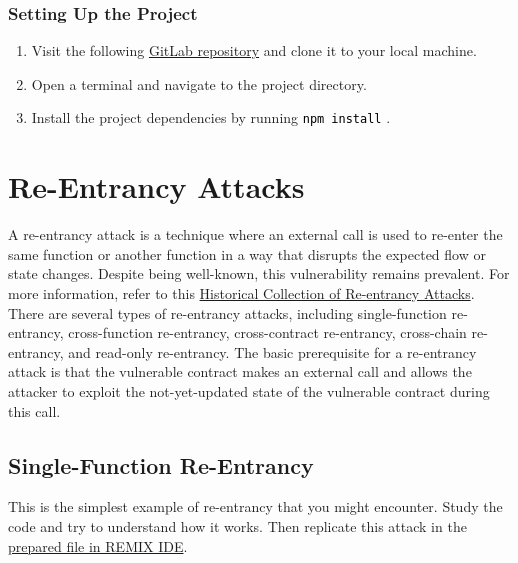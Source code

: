\documentclass[12pt]{article}
\newcommand{\codegrey}[1]{%
  \texttt{\colorbox{black!4}{\textcolor{black}{#1}}}%
}
\begin{document}
\subsubsection*{Setting Up the Project}

\begin{enumerate}
    \item Visit the following
          \href{https://gitlab.fel.cvut.cz/radovluk/smart-contracts-exercises/-/tree/main/05-Re-Entrancy/task/task-code}{GitLab
              repository} and clone it to your local machine.
    \item Open a terminal and navigate to the project directory.
    \item Install the project dependencies by running \codegrey{npm install}.
\end{enumerate}

\section{Re-Entrancy Attacks}

A re-entrancy attack is a technique where an external call is used to re-enter
the same function or another function in a way that disrupts the expected flow
or state changes. Despite being well-known, this vulnerability remains
prevalent. For more information, refer to this
\href{https://github.com/pcaversaccio/reentrancy-attacks?tab=readme-ov-file}{Historical
    Collection of Re-entrancy Attacks}. There are several types of re-entrancy
attacks, including single-function re-entrancy, cross-function re-entrancy,
cross-contract re-entrancy, cross-chain re-entrancy, and read-only re-entrancy.
The basic prerequisite for a re-entrancy attack is that the vulnerable contract
makes an external call and allows the attacker to exploit the not-yet-updated
state of the vulnerable contract during this call.

\subsection{Single-Function Re-Entrancy}

This is the simplest example of re-entrancy that you might encounter. Study the
code and try to understand how it works. Then replicate this attack in the
\href{https://remix.ethereum.org/?#activate=solidity&url=https://github.com/radovluk/unbreakable-vault/contracts/reentrancy01.sol&lang=en&optimize=false&runs=200&evmVersion=null&version=soljson-v0.8.28+commit.7893614a.js}{prepared
    file in REMIX IDE}.
\end{document}
